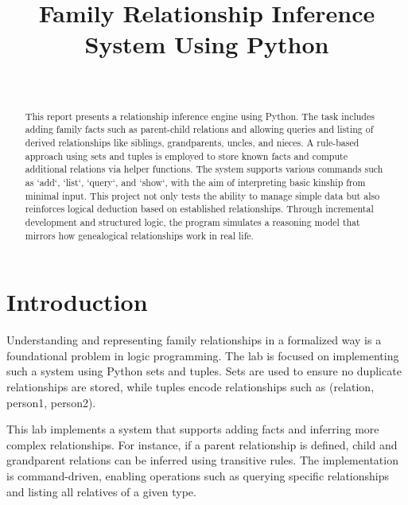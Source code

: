 \documentclass[a4paper, journal]{IEEEtran}
\begin{document}
\title{Family Relationship Inference System Using Python}

\author{
     \\
    }

\maketitle

\begin{abstract}
    This report presents a relationship inference engine using Python. The task includes adding family facts such as parent-child relations and allowing queries and listing of derived relationships like siblings, grandparents, uncles, and nieces. A rule-based approach using sets and tuples is employed to store known facts and compute additional relations via helper functions. The system supports various commands such as `add`, `list`, `query`, and `show`, with the aim of interpreting basic kinship from minimal input. This project not only tests the ability to manage simple data but also reinforces logical deduction based on established relationships. Through incremental development and structured logic, the program simulates a reasoning model that mirrors how genealogical relationships work in real life.
\end{abstract}

\section{Introduction}

Understanding and representing family relationships in a formalized way is a foundational problem in logic programming. The lab is focused on implementing such a system using Python sets and tuples. Sets are used to ensure no duplicate relationships are stored, while tuples encode relationships such as (relation, person1, person2).

This lab implements a system that supports adding facts and inferring more complex relationships. For instance, if a parent relationship is defined, child and grandparent relations can be inferred using transitive rules. The implementation is command-driven, enabling operations such as querying specific relationships and listing all relatives of a given type.
\end{document}
